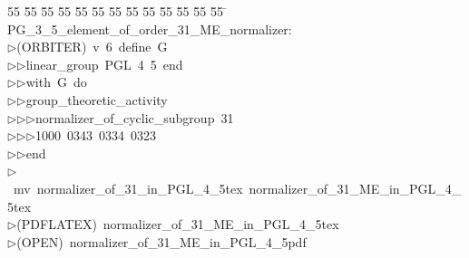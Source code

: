 %
%
\begin{tabbing}
55 \= 55 \= 55 \= 55 \= 55 \= 55 \= 55 \= 55 \= 55 \= 55 \= 55 \= 55 \= 55 \= \kill
PG\_3\_5\_element\_of\_order\_31\_ME\_normalizer:\\[0pt]
$\triangleright$\>(ORBITER)\ v\ 6\ define\ G\ \\[0pt]
$\triangleright$\>$\triangleright$\>linear\_group\ PGL\ 4\ 5\ end\ \\[0pt]
$\triangleright$\>$\triangleright$\>with\ G\ do\ \\[0pt]
$\triangleright$\>$\triangleright$\>group\_theoretic\_activity\ \\[0pt]
$\triangleright$\>$\triangleright$\>$\triangleright$\>normalizer\_of\_cyclic\_subgroup\ 31\ \\[0pt]
$\triangleright$\>$\triangleright$\>$\triangleright$\>1000\ 0343\ 0334\ 0323\ \\[0pt]
$\triangleright$\>$\triangleright$\>end\\[0pt]
$\triangleright$\>\ mv\ normalizer\_of\_31\_in\_PGL\_4\_5tex\ normalizer\_of\_31\_ME\_in\_PGL\_4\_5tex\\[0pt]
$\triangleright$\>(PDFLATEX)\ normalizer\_of\_31\_ME\_in\_PGL\_4\_5tex\\[0pt]
$\triangleright$\>(OPEN)\ normalizer\_of\_31\_ME\_in\_PGL\_4\_5pdf\\[0pt]
\end{tabbing}
